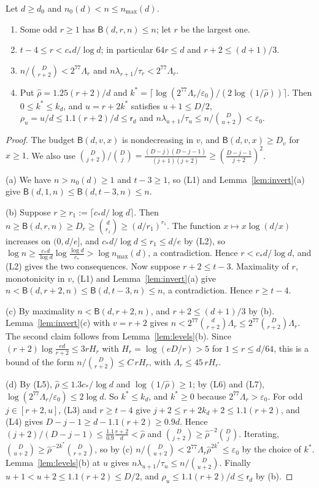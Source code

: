 \begin{lemma}\label{lem:cutoff}
Let $d\ge d_0$ and $n_0(d)<n\le n_{\max}(d)$.
\begin{enumerate}
\item[(a)] Some odd $r\ge1$ has $\mathsf B(d,r,n)\le n$; let $r$ be the
largest one.
\item[(b)] $t-4\le r<c_*d/\log d$; in particular $64r\le d$ and
$r+2\le(d+1)/3$.
\item[(c)] $n/\binom D{r+2}<2^{77}\Lambda_r$ and
$n\lambda_{r+1}/\tau_r<2^{77}\Lambda_r$.
\item[(d)] Put $\hat\rho=1.25(r+2)/d$ and
$k^*=\lceil\log(2^{77}\Lambda_r/\varepsilon_0)/(2\log(1/\hat\rho))\rceil$.
Then $0\le k^*\le k_d$, and $u=r+2k^*$ satisfies $u+1\le D/2$,
$\rho_u=u/d\le1.1(r+2)/d\le\mathsf r_d$ and
$n\lambda_{u+1}/\tau_u\le n/\binom D{u+2}<\varepsilon_0$.
\end{enumerate}
\end{lemma}
\begin{proof}
The budget $\mathsf B(d,v,x)$ is nondecreasing in $v$, and
$\mathsf B(d,v,x)\ge D_v$ for $x\ge1$. We also use
$\binom D{j+2}/\binom Dj=\frac{(D-j)(D-j-1)}{(j+1)(j+2)}\ge
(\frac{D-j-1}{j+2})^2$.

(a) We have $n>n_0(d)\ge1$ and $t-3\ge1$, so (L1) and
Lemma~\ref{lem:invert}(a) give $\mathsf B(d,1,n)\le\mathsf B(d,t-3,n)\le n$.

(b) Suppose $r\ge r_1:=\lceil c_*d/\log d\rceil$. Then
$n\ge\mathsf B(d,r,n)\ge D_r\ge\binom d{r_1}\ge(d/r_1)^{r_1}$. The function
$x\mapsto x\log(d/x)$ increases on $(0,d/e]$, and
$c_*d/\log d\le r_1\le d/e$ by (L2), so
$\log n\ge\frac{c_*d}{\log d}\log\frac{\log d}{c_*}>\log n_{\max}(d)$, a
contradiction. Hence $r<c_*d/\log d$, and (L2) gives the two consequences.
Now suppose $r+2\le t-3$. Maximality of $r$, monotonicity in $v$, (L1) and
Lemma~\ref{lem:invert}(a) give
$n<\mathsf B(d,r+2,n)\le\mathsf B(d,t-3,n)\le n$, a contradiction. Hence
$r\ge t-4$.

(c) By maximality $n<\mathsf B(d,r+2,n)$, and $r+2\le(d+1)/3$ by (b).
Lemma~\ref{lem:invert}(c) with $v=r+2$ gives
$n<2^{77}\binom d{r+2}\Lambda_r\le2^{77}\binom D{r+2}\Lambda_r$. The second
claim follows from Lemma~\ref{lem:levels}(b). Since
$(r+2)\log\frac{ed}{r+2}\le3rH_r$ with $H_r=\log(eD/r)>5$ for
$1\le r\le d/64$, this is a bound of the form
$n/\binom D{r+2}\le C\,rH_r$, with $\Lambda_r\le45\,rH_r$.

(d) By (L5), $\hat\rho\le1.3c_*/\log d$ and $\log(1/\hat\rho)\ge1$; by
(L6) and (L7), $\log(2^{77}\Lambda_r/\varepsilon_0)\le2\log d$. So
$k^*\le k_d$, and $k^*\ge0$ because $2^{77}\Lambda_r>\varepsilon_0$. For
odd $j\in[r+2,u]$, (L3) and $r\ge t-4$ give $j+2\le r+2k_d+2\le1.1(r+2)$,
and (L4) gives $D-j-1\ge d-1.1(r+2)\ge0.9d$. Hence
$(j+2)/(D-j-1)\le\frac{1.1}{0.9}\frac{r+2}d<\hat\rho$ and
$\binom D{j+2}\ge\hat\rho^{-2}\binom Dj$. Iterating,
$\binom D{u+2}\ge\hat\rho^{-2k^*}\binom D{r+2}$, so by (c)
$n/\binom D{u+2}<2^{77}\Lambda_r\hat\rho^{2k^*}\le\varepsilon_0$ by the
choice of $k^*$. Lemma~\ref{lem:levels}(b) at $u$ gives
$n\lambda_{u+1}/\tau_u\le n/\binom D{u+2}$. Finally
$u+1<u+2\le1.1(r+2)\le D/2$, and $\rho_u\le1.1(r+2)/d\le\mathsf r_d$ by
(b).
\end{proof}

